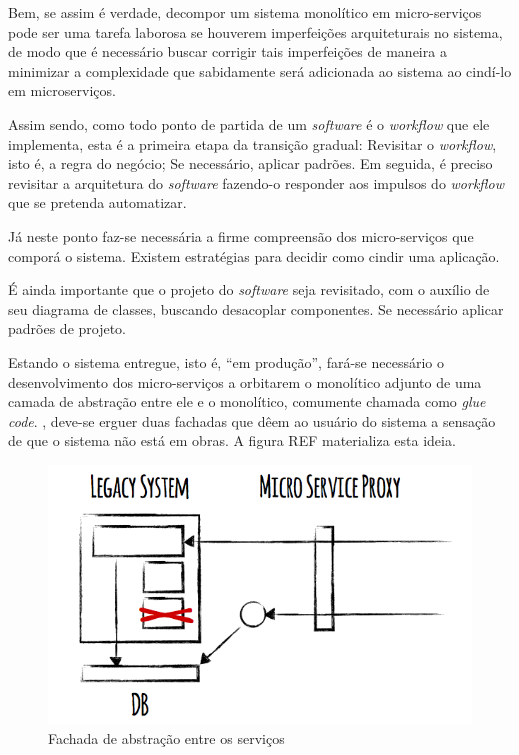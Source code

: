 Bem, se assim é verdade, decompor um sistema monolítico em micro-serviços pode ser uma tarefa laborosa se houverem imperfeições arquiteturais no sistema, de modo que é necessário buscar corrigir tais imperfeições de maneira a minimizar a complexidade que sabidamente será adicionada ao sistema ao cindí-lo em microserviços.

Assim sendo, como todo ponto de partida de um \textit{software} é o \textit{workflow} que ele implementa, esta é a primeira etapa da transição gradual: Revisitar o \textit{workflow}, isto é, a regra do negócio; Se necessário, aplicar padrões. Em seguida, é preciso revisitar a arquitetura do \textit{software} fazendo-o responder aos impulsos do \textit{workflow} que se pretenda automatizar.

Já neste ponto faz-se necessária a firme compreensão dos micro-serviços que comporá o sistema. Existem estratégias para decidir como cindir uma aplicação.

É ainda importante que o projeto do \textit{software} seja revisitado, com o auxílio de seu diagrama de classes, buscando desacoplar componentes. Se necessário aplicar padrões de projeto.

Estando o sistema entregue, isto é, ``em produção'', fará-se necessário o desenvolvimento dos micro-serviços a orbitarem o monolítico adjunto de uma camada de abstração entre ele e o monolítico, comumente chamada como \textit{glue code}. , deve-se erguer duas fachadas que dêem ao usuário do sistema a sensação de que o sistema não está em obras. A figura REF materializa esta ideia.

\begin{figure}
\centering
\includegraphics[width=14cm]{micro-service-architecture-proxy}
\caption{Fachada de abstração entre os serviços}
\end{figure}

